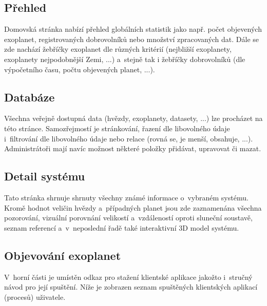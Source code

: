 \documentclass[a4paper,12pt]{article}
\begin{document}
{{{{{{{{{{{\subsection{Přehled}

Domovská stránka nabízí přehled globálních statistik jako např. počet objevených exoplanet, registrovaných dobrovolníků nebo množství zpracovaných dat. Dále se zde nachází žebříčky exoplanet dle různých kritérií (nejbližší exoplanety, exoplanety nejpodobnější Zemi, ...) a~stejně tak i žebříčky dobrovolníků (dle výpočetního času, počtu objevených planet, ...).


\subsection{Databáze}

Všechna veřejně dostupná data (hvězdy, exoplanety, datasety, ...) lze procházet na této stránce. Samozřejmostí je stránkování, řazení dle libovolného údaje i~filtrování dle libovolného údaje nebo relace (rovná se, je menší, obsahuje, ...). Administrátoři mají navíc možnost některé položky přidávat, upravovat či mazat.


\subsection{Detail systému}

Tato stránka shrnuje shrnuty všechny známé informace o~vybraném systému. Kromě hodnot veličin hvězdy a~případných planet jsou zde zaznamenána všechna pozorování, vizuální porovnání velikostí a~vzdáleností oproti sluneční soustavě, seznam referencí a~v~neposlední řadě také interaktivní 3D model systému.


\subsection{Objevování exoplanet}

\vspace{-8pt}

V~horní části je umístěn odkaz pro stažení klientské aplikace jakožto i~stručný návod pro její spuštění. Níže je zobrazen seznam spuštěných klientských aplikací (procesů) uživatele.

}}}}}}}}}}}
\end{document}
